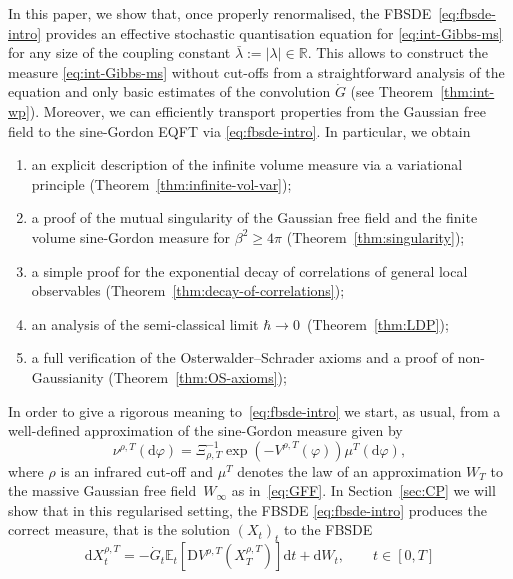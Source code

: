 \documentclass[11pt, a4paper]{scrartcl}
\numberwithin{equation}{section}
\theoremstyle{plain}
\theoremstyle{remark}
\newcommand{\mathD}{\mathrm{D}}
\newcommand{\mathd}{\mathrm{d}}
\newenvironment{enumeratealpha}{\begin{enumerate}[a{\textup{)}}] }{\end{enumerate}}
\begin{document}
In this paper, we show that, once properly renormalised, the
FBSDE~\eqref{eq:fbsde-intro} provides an effective stochastic quantisation
equation for \eqref{eq:int-Gibbs-ms} for any size of the coupling constant $\bar{\lambda}:=|\lambda|\in \mathbb{R}$. This allows to construct the measure
\eqref{eq:int-Gibbs-ms} without cut-offs from a straightforward analysis of the
equation and only basic estimates of the convolution $\dot{G}$ (see
Theorem~\ref{thm:int-wp}). Moreover, we can efficiently transport properties
from the Gaussian free field to the sine-Gordon EQFT via
\eqref{eq:fbsde-intro}. In particular, we obtain
\begin{enumeratealpha}
  \item an explicit description of the infinite volume measure via a
  variational principle (Theorem~\ref{thm:infinite-vol-var});
  
  \item a proof of the mutual singularity of the Gaussian free field and the
  finite volume sine-Gordon measure for $\beta^2 \geqslant 4 \pi$ (Theorem~\ref{thm:singularity}); 
  
  \item a simple proof for the exponential decay of correlations of general
  local observables (Theorem~\ref{thm:decay-of-correlations});
  
  \item an analysis of the semi-classical limit $\hbar \rightarrow
  0$~(Theorem~\ref{thm:LDP});
  
  \item a full verification of the Osterwalder--Schrader axioms and a proof of
  non-Gaussianity (Theorem~\ref{thm:OS-axioms});
\end{enumeratealpha}
In order to give a rigorous meaning
to~\eqref{eq:fbsde-intro} we start, as usual, from a well-defined
approximation of the sine-Gordon measure given by
\begin{equation}
  \nu^{\rho, T} (\mathd \varphi) = \Xi_{\rho, T}^{- 1} \exp (- V^{\rho, T}
  (\varphi)) \mu^T (\mathd \varphi) \label{eq:int-approx-measures},
\end{equation}
where $\rho$ is an infrared cut-off and $\mu^T$ denotes the law of an
approximation $W_T$ to the massive Gaussian free field~$W_{\infty}$ as
in~\eqref{eq:GFF}. In Section~\ref{sec:CP} we will show that in this
regularised setting, the FBSDE \eqref{eq:fbsde-intro} produces the correct
measure, that is the solution $(X_t)_t$ to the FBSDE
\begin{equation}
  \mathd X^{\rho, T}_t = - \dot{G}_t \mathbb{E}_t [\mathD V^{\rho, T} (X^{\rho, T}_T)] \mathd t +
  \mathd W_t, \qquad t \in [0, T] \label{eq:approx-fbsde}
\end{equation}
\end{document}
